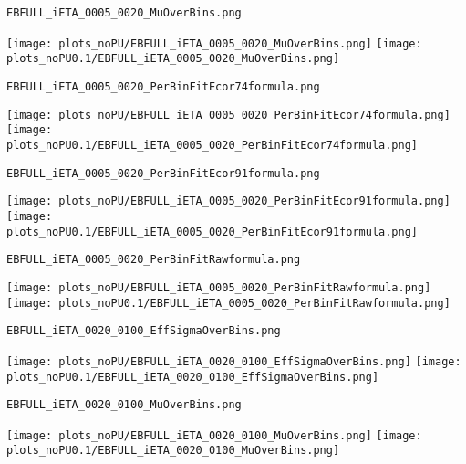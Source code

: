 \begin{frame}[fragile]
\begin{verbatim}
EBFULL_iETA_0005_0020_MuOverBins.png
\end{verbatim}
\texttt{[image: plots\_noPU/EBFULL\_iETA\_0005\_0020\_MuOverBins.png]}
\texttt{[image: plots\_noPU0.1/EBFULL\_iETA\_0005\_0020\_MuOverBins.png]}
\end{frame}
\begin{frame}[fragile]
\begin{verbatim}
EBFULL_iETA_0005_0020_PerBinFitEcor74formula.png
\end{verbatim}
\texttt{[image: plots\_noPU/EBFULL\_iETA\_0005\_0020\_PerBinFitEcor74formula.png]}
\texttt{[image: plots\_noPU0.1/EBFULL\_iETA\_0005\_0020\_PerBinFitEcor74formula.png]}
\end{frame}
\begin{frame}[fragile]
\begin{verbatim}
EBFULL_iETA_0005_0020_PerBinFitEcor91formula.png
\end{verbatim}
\texttt{[image: plots\_noPU/EBFULL\_iETA\_0005\_0020\_PerBinFitEcor91formula.png]}
\texttt{[image: plots\_noPU0.1/EBFULL\_iETA\_0005\_0020\_PerBinFitEcor91formula.png]}
\end{frame}
\begin{frame}[fragile]
\begin{verbatim}
EBFULL_iETA_0005_0020_PerBinFitRawformula.png
\end{verbatim}
\texttt{[image: plots\_noPU/EBFULL\_iETA\_0005\_0020\_PerBinFitRawformula.png]}
\texttt{[image: plots\_noPU0.1/EBFULL\_iETA\_0005\_0020\_PerBinFitRawformula.png]}
\end{frame}
\begin{frame}[fragile]
\begin{verbatim}
EBFULL_iETA_0020_0100_EffSigmaOverBins.png
\end{verbatim}
\texttt{[image: plots\_noPU/EBFULL\_iETA\_0020\_0100\_EffSigmaOverBins.png]}
\texttt{[image: plots\_noPU0.1/EBFULL\_iETA\_0020\_0100\_EffSigmaOverBins.png]}
\end{frame}
\begin{frame}[fragile]
\begin{verbatim}
EBFULL_iETA_0020_0100_MuOverBins.png
\end{verbatim}
\texttt{[image: plots\_noPU/EBFULL\_iETA\_0020\_0100\_MuOverBins.png]}
\texttt{[image: plots\_noPU0.1/EBFULL\_iETA\_0020\_0100\_MuOverBins.png]}
\end{frame}
